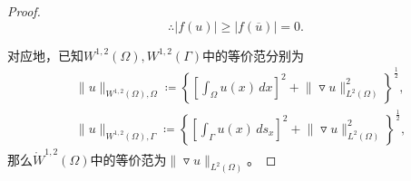 \begin{proof}
\begin{equation*}
  \therefore \big| f\left(u\right) \big| \ge \big| f\left(\overline{u} \right)\big| = 0.
\end{equation*}

对应地，已知$W^{1,2}(\Omega),W^{1,2}(\Gamma)$中的等价范分别为
\begin{equation}
  \label{eq:sobolev-equivalence-norm-w12omega}
  \begin{split}
    &\big\| u \big\|_{W^{1,2}(\Omega), \Omega} \coloneqq \left\{
    \left[
    \int_{\Omega} u(x) \, dx
    \right]^2
    + \big\| \triangledown u \big\|^2_{L^2(\Omega)}
     \right\}^{\frac{1}{2}}, \\
     &\big\| u \big\|_{W^{1,2}(\Omega), \Gamma} \coloneqq \left\{
     \left[
     \int_{\Gamma} u(x) \, ds_x
     \right]^2
     + \big\| \triangledown u \big\|^2_{L^2(\Omega)}
      \right\}^{\frac{1}{2}},
  \end{split}
\end{equation}
那么$\mathring{W}^{1,2}(\Omega)$中的等价范为$\big\| \triangledown u \big\|_{L^2(\Omega)}$。
\end{proof}

